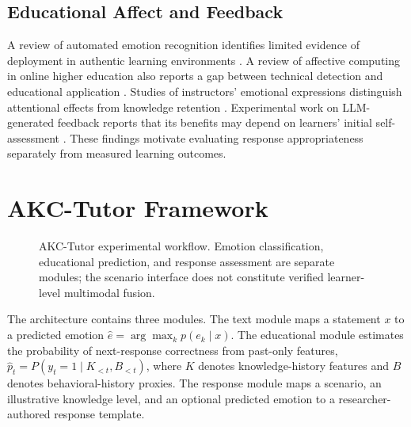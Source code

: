 \documentclass[conference]{IEEEtran}
\begin{document}
\subsection{Educational Affect and Feedback}
A review of automated emotion recognition identifies limited evidence of deployment in authentic learning environments \cite{yu24emotion}. A review of affective computing in online higher education also reports a gap between technical detection and educational application \cite{affect26}. Studies of instructors' emotional expressions distinguish attentional effects from knowledge retention \cite{zhang24video}. Experimental work on LLM-generated feedback reports that its benefits may depend on learners' initial self-assessment \cite{liebenow25}. These findings motivate evaluating response appropriateness separately from measured learning outcomes.

\section{AKC-Tutor Framework}
\begin{figure}[t]
\centering
\setlength{\fboxsep}{7pt}
\caption{AKC-Tutor experimental workflow. Emotion classification, educational prediction, and response assessment are separate modules; the scenario interface does not constitute verified learner-level multimodal fusion.}\label{fig:architecture}
\end{figure}
The architecture contains three modules. The text module maps a statement $x$ to a predicted emotion $\hat e=\arg\max_k p(e_k\mid x)$. The educational module estimates the probability of next-response correctness from past-only features, $\hat p_t=P(y_t=1\mid K_{<t},B_{<t})$, where $K$ denotes knowledge-history features and $B$ denotes behavioral-history proxies. The response module maps a scenario, an illustrative knowledge level, and an optional predicted emotion to a researcher-authored response template.
\end{document}
